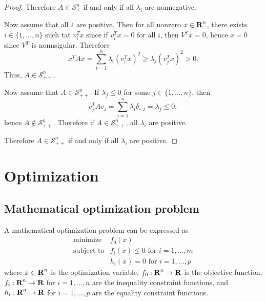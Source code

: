 \documentclass[11pt, oneside]{article}   	%
\newcommand{\possemidefset}[1]{\mathcal{S}_+^{#1}}
\newcommand{\posdefset}[1]{\mathcal{S}_{++}^{#1}}
\begin{document}
\begin{itemize}
\begin{proof}
Therefore $A\in\possemidefset{n}$ if and only if all $\lambda_i$ are nonnegative.

Now assume that all $\label_i$ are positive.
Then for all nonzero $x\in{\mbox{\bf R}}^n$,
there exists $i\in\{1,\ldots,n\}$ such tat $v_i^Tx$
since if $v_i^Tx=0$ for all $i$, then
$V^T x = 0$, hence $x=0$ since $V^T$ is nonnsigular.
Therefore
\begin{equation}
x^T A x = \sum_{i=1}^n \lambda_i (v_i^T x)^2
\geq \lambda_j (v_j^T x)^2 > 0.
\end{equation}
Thus, $A\in\posdefset{n}$.

Now assume that $A\in\posdefset{n}$.
If $\lambda_j \leq 0$ for some $j\in\{1,\ldots,n\}$,
then
\begin{equation}
v_j^T A v_j
= \sum_{i=1}^n \lambda_i \delta_{i,j}
= \lambda_j \leq 0,
\end{equation}
hence $A\not\in\posdefset{n}$. Therefore if $A\in\posdefset{n}$, all $\lambda_i$ are positive.

Therefore $A\in\posdefset{n}$ if and only if all $\lambda_i$ are positive.

\end{proof}



\end{itemize}

\newpage
\section{Optimization}

\subsection{Mathematical optimization problem}

A mathematical optimization problem can be expressed as
\begin{equation}
\label{eq:opt-prob}
\begin{array}{ll}
\mbox{minimize} & f_0(x)
\\
\mbox{subject to} & f_i(x) \leq 0 \mbox{ for } i = 1, \ldots, m
\\
& h_i(x) = 0 \mbox{ for } i = 1, \ldots, p
\end{array}
\end{equation}
where
$x\in{\mbox{\bf R}}^n$ is the optimization variable,
$f_0:{\mbox{\bf R}}^n\to{\mbox{\bf R}}$ is the objective function,
$f_i:{\mbox{\bf R}}^n\to{\mbox{\bf R}}$ for $i=1,\ldots,n$ are the inequality constraint functions,
and
$h_i:{\mbox{\bf R}}^n\to{\mbox{\bf R}}$ for $i=1,\ldots,p$ are the equality constraint functions.
\end{document}
